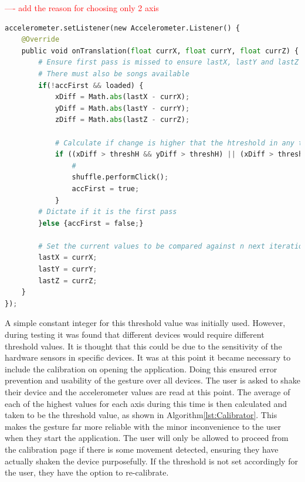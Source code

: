 \documentclass{l4proj}
\begin{document}
\textcolor{red}{---- add the reason for choosing only 2 axis}

\begin{lstlisting}[language=python, float, caption={Java code detailing how the Shake Gesture is detected and how it is acted upon, this particular instance for when detection is made on the Tunes Activity.}, label=lst:Accelerometer]
accelerometer.setListener(new Accelerometer.Listener() {
    @Override
    public void onTranslation(float currX, float currY, float currZ) {
        # Ensure first pass is missed to ensure lastX, lastY and lastZ have values
        # There must also be songs available 
        if(!accFirst && loaded) {
            xDiff = Math.abs(lastX - currX);
            yDiff = Math.abs(lastY - currY);
            zDiff = Math.abs(lastZ - currZ);

            # Calculate if change is higher that the htreshold in any two axis
            if ((xDiff > threshH && yDiff > threshH) || (xDiff > threshH && zDiff > threshH) || (yDiff > threshH && zDiff > threshH)){
                # 
                shuffle.performClick();
                accFirst = true;
            }
        # Dictate if it is the first pass
        }else {accFirst = false;}

        # Set the current values to be compared against n next iteration
        lastX = currX;
        lastY = currY;
        lastZ = currZ;
    }        
});
\end{lstlisting}

A simple constant integer for this threshold value was initially used. However, during testing it was found that different devices would require different threshold values. It is thought that this could be due to the sensitivity of the hardware sensors in specific devices. It was at this point it became necessary to include the calibration on opening the application. Doing this ensured error prevention and usability of the gesture over all devices. The user is asked to shake their device and the accelerometer values are read at this point. The average of each of the highest values for each axis during this time is then calculated and taken to be the threshold value, as shown in Algorithm\ref{lst:Calibrator}. This makes the gesture far more reliable with the minor inconvenience to the user when they start the application. The user will only be allowed to proceed from the calibration page if there is some movement detected, ensuring they have actually shaken the device purposefully. If the threshold is not set accordingly for the user, they have the option to re-calibrate.
\end{document}
